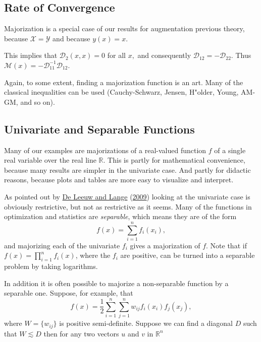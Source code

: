 \documentclass[
  12pt,
]{book}
\begin{document}
\hypertarget{rate-of-convergence}{%
\subsection{Rate of Convergence}\label{rate-of-convergence}}

Majorization is a special case of our results for augmentation
previous theory, because \(\mathcal{X}=\mathcal{Y}\) and because \(y(x)=x\).

This implies that \(\mathcal{D}_2(x,x)=0\)
for all \(x,\) and
consequently \(\mathcal{D}_{12}=-\mathcal{D}_{22}.\)
Thus \(\mathcal{M}(x)=-\mathcal{D}_{11}^{-1}\mathcal{D}_{12}^{\ }.\)

Again, to some extent, finding a majorization function is an art. Many
of the classical inequalities can be used (Cauchy-Schwarz, Jensen, H"older,
Young, AM-GM, and so on).

\hypertarget{univariate-and-separable-functions}{%
\subsection{Univariate and Separable Functions}\label{univariate-and-separable-functions}}

Many of our examples are majorizations of a real-valued function \(f\) of a single real variable over the real line \(\mathbb{R}.\) This is partly for
mathematical convenience, because many results are simpler in the univariate case. And partly for didactic reasons, because plots and tables are
more easy to visualize and interpret.

As pointed out by
\protect\hyperlink{ref-deleeuw_lange_A_09}{De Leeuw and Lange} (\protect\hyperlink{ref-deleeuw_lange_A_09}{2009}) looking at the univariate case is obviously restrictive, but not as restrictive as it seems. Many
of the functions in optimization and statistics are \emph{separable}, which means they are of the form
\[
f(x)=\sum_{i=1}^n f_i(x_i),
\]
and majorizing each of the univariate \(f_i\) gives a majorization of \(f\).
Note that if \(f(x)=\prod_{i=1}^n f_i(x)\), where the \(f_i\) are positive,
can be turned into a separable problem by taking logarithms.

In addition it is often possible to majorize a non-separable function by a separable one. Suppose, for example, that
\[
f(x)=\frac12\sum_{i=1}^n\sum_{j=1}^n w_{ij}f_i(x_i)f_j(x_j),
\]
where \(W=\{w_{ij}\}\) is positive semi-definite. Suppose we can find a diagonal \(D\) such that \(W\lesssim D\) then for any two vectors \(u\)
and \(v\) in \(\mathbb{R}^n\)
\end{document}
